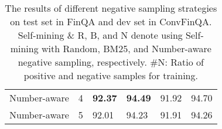 \documentclass[11pt]{article}
\begin{document}
\begin{table}[t]
{\begin{tabular}{lc|ll|ll}
Number-aware          & 4                         & \textbf{92.37}       & \textbf{94.49}       & 91.92      & 94.70     \\
Number-aware          & 5                         & 92.01          & 94.23           & 91.91          & 94.26             \\ \hline
\end{tabular}
}
\caption{The results of different negative sampling strategies on test set in FinQA and dev set in ConvFinQA. Self-mining  \& R, B, and N denote using Self-mining with Random, BM25, and Number-aware negative sampling, respectively. \#N: Ratio of positive and negative samples for training.}
\label{table:number-aware}
\end{table}

\begin{table}[htbp]
\caption{
The performances of APOLLO with consistency-based reinforcement learning and different target program augmentation methods. RL \& TPA denotes combine two approches, which performs best on both datasets.}
\label{table:RL_TPA}
\end{table}
\end{document}
